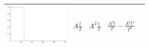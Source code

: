 \begin{table}[htdp]
\begin{center}
\begin{tabular}{|c|c|c|c|c|}
\hline
\includegraphics[height=2cm]{./bilder/pwm.pdf}  & $A\frac{t}{T}$ &
$A^2\frac{t}{T}$ & $\frac{A^2t}{T}-\frac{A^2t^2}{T^2}$ \\
\hline




\end{tabular}
\end{center}
\label{default}
\end{table}%


